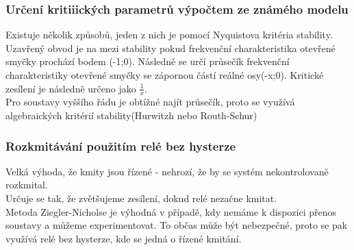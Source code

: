 \subsubsection*{Určení kritiiických parametrů výpočtem ze známého modelu}
Existuje několik způsobů, jeden z nich je pomocí Nyquistova kritéria stability. Uzavřený obvod je na mezi stability pokud frekvenční charakteristika otevřené smyčky prochází bodem (-1;0). Následně se určí průsečík frekvenční charakteristiky otevřené smyčky se zápornou částí reálné osy(-x;0). Kritické zesílení je následně určeno jako $\frac{1}{x}$.\\
Pro soustavy vyššího řádu je obtížné najít průsečík, proto se využívá algebraických kritérií stability(Hurwitzh nebo Routh-Schur)

\subsubsection*{Rozkmitávání použitím relé bez hysterze}
Velká výhoda, že kmity jsou řízené - nehrozí, že by se systém nekontrolovaně rozkmital.\\
Určuje se tak, že zvětšujeme zesílení, dokud relé  nezačne kmitat.\\

Metoda Ziegler-Nicholse je výhodná v případě, kdy nemáme k dispozici přenos soustavy a můžeme experimentovat. To občas může být nebezpečné, proto se pak využívá relé bez hysterze, kde se jedná o řízené kmitání.\\

